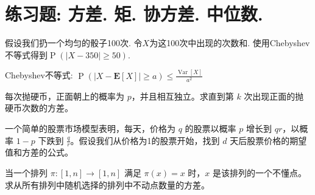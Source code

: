 \section*{练习题: 方差. 矩. 协方差. 中位数.}
\begin{exercise}
    假设我们扔一个均匀的骰子100次. 令$X$为这100次中出现的次数和. 使用Chebyshev不等式得到$\operatorname{P}(|X-350| \geq 50)$.
\end{exercise}
\begin{solution*}
    Chebyshev不等式: $\operatorname{P}(|X-\mathbf{E}[X]| \geq a) \leq \frac{\operatorname{Var}[X]}{a^2}$
\end{solution*}

\begin{exercise}
    每次抛硬币，正面朝上的概率为 \(p\)，并且相互独立。求直到第 \(k\) 次出现正面的抛硬币次数的方差。 
\end{exercise}

\begin{exercise}
一个简单的股票市场模型表明，每天，价格为 \( q \) 的股票以概率 \( p \) 增长到 \( qr \)，以概率 \( 1 - p \) 下跌到 \( \frac{q}{r} \)。假设我们从价格为1的股票开始，找到 \( d \) 天后股票价格的期望值和方差的公式。
\end{exercise}

\begin{exercise}
    当一个排列 \(\pi: [1, n] \rightarrow [1, n]\) 满足 \(\pi (x) = x\) 时，\(x\) 是该排列的一个不懂点。求从所有排列中随机选择的排列中不动点数量的方差。
\end{exercise}

